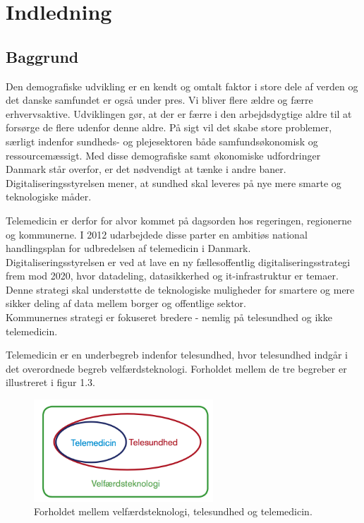 \chapter{Indledning}

\section{Baggrund}
Den demografiske udvikling er en kendt og omtalt faktor i store dele af verden og  det danske samfundet er også under pres. Vi bliver flere ældre og færre erhvervsaktive\cite{KL}. Udviklingen gør, at der er færre i den arbejdsdygtige aldre til at forsørge de flere udenfor denne aldre. På sigt vil det skabe store problemer, særligt indenfor sundheds- og plejesektoren både samfundsøkonomisk og ressourcemæssigt. Med disse demografiske samt økonomiske udfordringer Danmark står overfor, er det nødvendigt at tænke i andre baner. Digitaliseringsstyrelsen mener, at sundhed skal leveres på nye mere smarte og teknologiske måder\cite{Digst}.    

Telemedicin er derfor for alvor kommet på dagsorden hos regeringen, regionerne og kommunerne. I 2012 udarbejdede disse parter en ambitiøs national handlingsplan for udbredelsen af telemedicin i Danmark\cite{Digst}\cite{NationalH}.\\
Digitaliseringsstyrelsen er ved at lave en ny fællesoffentlig digitaliseringsstrategi frem mod 2020, hvor datadeling, datasikkerhed og it-infrastruktur er temaer\cite{digst1}. Denne strategi skal understøtte de teknologiske muligheder for smartere og mere sikker deling af data mellem borger og offentlige sektor\cite{digst2}.\\
Kommunernes strategi er fokuseret bredere - nemlig på telesundhed og ikke telemedicin.

Telemedicin er en underbegreb indenfor telesundhed, hvor telesundhed indgår i det overordnede begreb velfærdsteknologi\cite{KLs}. Forholdet mellem de tre begreber er illustreret i figur 1.3. 

\begin{figure}[H]
	\centering
		\caption{Forholdet mellem velfærdsteknologi, telesundhed og telemedicin\cite{KLs}.}
	\includegraphics[width=0.6\textwidth]{Figurer/Snip20160426_6}
\end{figure}

